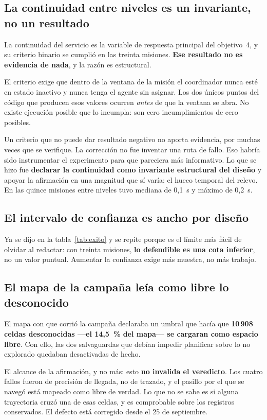 \subsection{La continuidad entre niveles es un invariante, no un resultado}

La continuidad del servicio es la variable de respuesta principal del objetivo~4,
y su criterio binario se cumplió en las treinta misiones. \textbf{Ese resultado no
es evidencia de nada}, y la razón es estructural.

El criterio exige que dentro de la ventana de la misión el coordinador nunca esté
en estado inactivo y nunca tenga el agente sin asignar. Los dos únicos puntos del
código que producen esos valores ocurren \emph{antes} de que la ventana se abra.
No existe ejecución posible que lo incumpla: son cero incumplimientos de cero
posibles.

Un criterio que no puede dar resultado negativo no aporta evidencia, por muchas
veces que se verifique. La corrección no fue inventar una ruta de fallo. Eso habría sido instrumentar el
experimento para que pareciera más informativo. Lo que se hizo fue
\textbf{declarar la continuidad como invariante estructural del diseño} y apoyar
la afirmación en una magnitud que sí varía: el hueco temporal del relevo. En las
quince misiones entre niveles tuvo mediana de 0,1~s y máximo de 0,2~s.

\subsection{El intervalo de confianza es ancho por diseño}

Ya se dijo en la tabla~\ref{tab:exito} y se repite porque es el límite más fácil
de olvidar al redactar: con treinta misiones, \textbf{lo defendible es una cota
inferior}, no un valor puntual. Aumentar la confianza exige más muestra, no más
trabajo.

\subsection{El mapa de la campaña leía como libre lo desconocido}

El mapa con que corrió la campaña declaraba un umbral que hacía que
\textbf{10\,908 celdas desconocidas —el 14,5~\% del mapa— se cargaran como
espacio libre}. Con ello, las dos salvaguardas que debían impedir planificar
sobre lo no explorado quedaban desactivadas de hecho.

El alcance de la afirmación, y no más: esto \textbf{no invalida el veredicto}. Los
cuatro fallos fueron de precisión de llegada, no de trazado, y el pasillo por el
que se navegó está mapeado como libre de verdad. Lo que no se sabe es si alguna
trayectoria cruzó una de esas celdas, y es comprobable sobre los registros
conservados. El defecto está corregido desde el 25 de septiembre.
